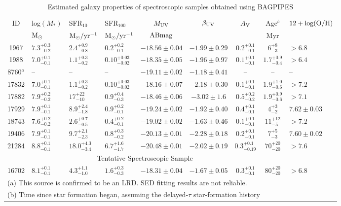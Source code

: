 \documentclass[twocolumn]{aastex631}
\begin{document}
\begin{table}[tb]
    \centering
    \caption{Estimated galaxy properties of spectroscopic samples obtained using BAGPIPES}
    \begin{tabular}{clllccccl}
    \hline
       ID  &  log$(M_{\ast})$ & {\rm SFR$_{10}$} & {\rm SFR$_{100}$} & $M_{\rm UV}$ & $\beta_{\rm UV}$ &  $ A_{\rm V}$ & Age$^{b}$ & $12+{\rm log(O/H)}$ \\
       & ${\rm M_{\odot}}$& ${\rm M_{\odot}/yr^{-1}}$ & ${\rm M_{\odot}/yr^{-1}}$ & ${\rm ABmag}$ & & & Myr &\\
    \hline
1967 & $7.3^{+0.3}_{-0.2}$ & $2.4^{+0.9}_{-0.8}$ & $0.2^{+0.2}_{-0.1}$ & $-18.56\pm0.04$ & $-1.99\pm0.29$& $0.2^{+0.1}_{-0.1}$& $6^{+8}_{-3}$ & $>6.8$\\
1988 & $7.0^{+0.1}_{-0.1}$& $1.1^{+0.3}_{-0.2}$ & $0.10^{+0.03}_{-0.02}$ & $-18.35\pm0.05$ & $-1.96\pm0.97$ & $0.1^{+0.1}_{-0.1}$& $1.7^{+0.9}_{-0.4}$ & $>6.4$\\
8760$^{a}$ & -- & -- & -- & $-19.11\pm0.02$ & $-1.18\pm0.41$ & -- & -- & -- \\
17832 & $7.0^{+0.1}_{-0.1}$ &$1.1^{+0.3}_{-0.2}$& $0.10^{+0.03}_{-0.02}$ & $-18.16\pm0.07$ & $-2.18\pm0.30$ & $0.1^{+0.1}_{-0.1}$& $1.9^{+1.0}_{-0.6}$ & $>7.2$\\
17882 & $7.9^{+0.2}_{-0.2}$ &$17^{+22}_{-10}$ & $0.9^{+0.4}_{-0.3}$ & $-18.46\pm0.06$ & $-3.02\pm1.6$ & $0.5^{+0.2}_{-0.2}$& $1.9^{+0.9}_{-0.6}$ & $>7.1$ \\
17929 & $7.9^{+0.1}_{-0.1}$ &$8.9^{+2.4}_{-1.8}$& $0.9^{+0.2}_{-0.1}$ & $-19.24\pm0.02$ & $-1.92\pm0.40$ & $0.4^{+0.1}_{-0.1}$& $4^{+3}_{-2}$ & $7.62\pm0.03$\\
18743 & $7.6^{+0.2}_{-0.2}$ &$2.6^{+0.7}_{-0.5}$& $0.4^{+0.2}_{-0.1}$ & $-19.02\pm0.02$ & $-1.63\pm0.46$ & $0.1^{+0.1}_{-0.1}$& $11^{+12}_{-5}$ & $>7.2$\\
19406 & $7.9^{+0.1}_{-0.1}$ &$9.7^{+2.1}_{-2.3}$& $0.8 ^{+0.3}_{-0.2}$ & $-20.13\pm0.01$ & $-2.28\pm0.18$ & $0.2^{+0.1}_{-0.1}$& $7^{+5}_{-3}$ & $7.60\pm0.02$\\
21284 & $8.8^{+0.1}_{-0.1}$ &$18.0^{+4.3}_{-3.4}$& $6.7^{+1.6}_{-1.7}$ & $-20.48\pm0.01$ & $-2.02\pm0.19$& $0.3^{+0.1}_{-0.19}$& $70^{+20}_{-20}$ & $>7.6$\\
    \hline
    \multicolumn{8}{c}{Tentative Spectroscopic Sample}\\
    \hline
    16702 & $8.1^{+0.1}_{-0.1}$ & $4.3^{+1.1}_{-1.0}$ & $1.6^{+0.3}_{-0.3}$ & $-18.31\pm0.04$ & $-1.67\pm0.05$ & $0.3^{+0.1}_{-0.1}$ &  $80^{+20}_{-20}$ & $>6.8$\\
    \hline
    \multicolumn{8}{l}{(a) This source is confirmed to be an LRD. SED fitting results are not reliable.}\\
    \multicolumn{8}{l}{(b) Time since star formation began, assuming the delayed-$\tau$ star-formation history}\\
    \end{tabular}
    \label{tab:sedfit}
\end{table}
\end{document}
